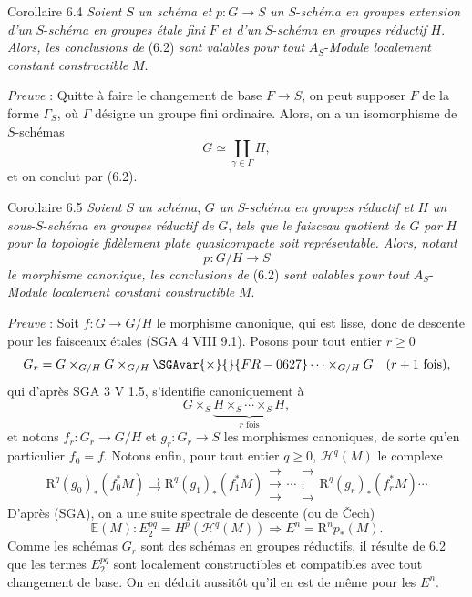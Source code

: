 \begin{statement}{Corollaire 6.4}
\emph{Soient} $S$ \emph{un schéma et} $p:G\to S$ \emph{un} $S$-\emph{schéma en groupes extension d'un} $S$-\emph{schéma en groupes étale fini} $F$ \emph{et d'un} $S$-\emph{schéma en groupes réductif} $H$. \emph{Alors, les conclusions de} (6.2) \emph{sont valables pour tout} $A_S$-\emph{Module localement constant constructible} $M$.
\end{statement}

\emph{Preuve} : Quitte à faire le changement de base $F\to S$, on peut supposer $F$ de la forme $\Gamma_S$, où $\Gamma$ désigne un groupe fini ordinaire. Alors, on a un isomorphisme de $S$-schémas
\[
G\simeq\coprod_{\gamma\in\Gamma}H,
\]
et on conclut par (6.2).

\begin{statement}{Corollaire 6.5}
\emph{Soient} $S$ \emph{un schéma}, $G$ \emph{un} $S$-\emph{schéma en groupes réductif et} $H$ \emph{un sous}-$S$-\emph{schéma en groupes réductif de} $G$, \emph{tels que le faisceau quotient de} $G$ \emph{par} $H$ \emph{pour la topologie fidèlement plate quasicompacte soit représentable. Alors, notant}
\[
p:G/H\to S
\]
\emph{le morphisme canonique, les conclusions de} (6.2) \emph{sont valables pour tout} $A_S$-\emph{Module localement constant constructible} $M$.
\end{statement}

\emph{Preuve} : Soit $f:G\to G/H$ le morphisme canonique, qui est lisse, donc de descente pour les faisceaux étales (SGA 4 VIII 9.1). Posons pour tout entier $r\ge0$
\[
G_r=G\times_{G/H}G\times_{G/H}\SGAvar{\times}{}{FR-0627}\cdots\times_{G/H}G
\quad(r+1\text{ fois}),
\]
qui d'après SGA 3 V 1.5, s'identifie canoniquement à
\[
G\times_S\underbrace{H\times_S\cdots\times_S H}_{r\text{ fois}},
\]
et notons $f_r:G_r\to G/H$ et $g_r:G_r\to S$ les morphismes canoniques, de sorte qu'en particulier $f_0=f$. Notons enfin, pour tout entier $q\ge0$, $\mathcal{H}^q(M)$ le complexe
\[
\mathrm{R}^q(g_0)_*(f_0^*M)\rightrightarrows \mathrm{R}^q(g_1)_*(f_1^*M)\mathrel{\substack{\to\\\to\\\to}}\cdots\mathrel{\substack{\to\\\vdots\\\to}} \mathrm{R}^q(g_r)_*(f_r^*M)\cdots
\]
D'après (SGA), on a une suite spectrale de descente (ou de Čech)
\[
\mathbb{E}(M):E_2^{pq}=H^p(\mathcal{H}^q(M))\Rightarrow E^n=\mathrm{R}^np_*(M).
\]
Comme les schémas $G_r$ sont des schémas en groupes réductifs, il résulte de 6.2 que les termes $E_2^{pq}$ sont localement  constructibles et compatibles avec tout changement de base. On en déduit aussitôt qu'il en est de même pour les $E^n$.

